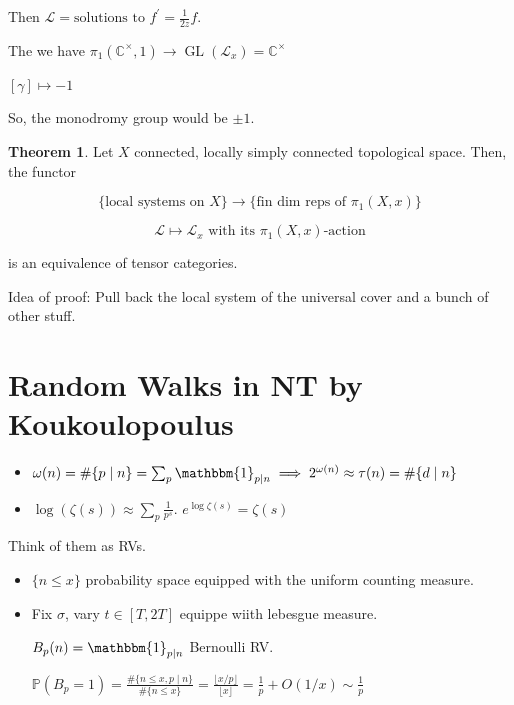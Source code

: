 \documentclass{article}
\theoremstyle{definition}
\newtheorem{theorem}{Theorem}
\begin{document}
    Then \(\mathcal{L} = \text{solutions to } f^{\prime} = \frac{1}{2z}f\).

    The we have \(\pi_1(\mathbb{C}^\times,1) \to \operatorname{GL}(\mathcal{L}_x) = \mathbb{C}^{\times}\)

    \([\gamma] \mapsto -1\)

    So, the monodromy group would be \(\pm 1\).

    \begin{theorem}
        Let \(X\) connected, locally simply connected topological space. Then, the functor

        \[
            \{ \text{local systems on } X \} \to \{ \text{fin dim reps of } \pi_1(X,x) \}  
        \]

        \[
            \mathcal{L} \mapsto \mathcal{L}_x \text{ with its \(\pi_1(X,x)\)-action} 
        \]

        is an equivalence of tensor categories.
    \end{theorem}

    Idea of proof: Pull back the local system of the universal cover and a bunch of other stuff.

    \section*{Random Walks in NT by Koukoulopoulus}

    \begin{itemize}
        \item \(\omega(n) = \#\{ p \mid n \} = \sum_{p} \mathbbm{1}_{p\mid n} \implies 2^{\omega(n)} \approx \tau (n) = \#\{ d\mid n \} \)
        \item \(\log (\zeta (s)) \approx \sum_{p} \frac{1}{p^s}\). \(e^{\log \zeta (s)} = \zeta(s)\)    
    \end{itemize}
    
    Think of them as RVs.

    \begin{itemize}
        \item \(\{ n \leq x \}\) probability space equipped with the uniform counting measure.
        \item Fix \(\sigma\), vary \(t\in [T,2T]\) equippe wiith lebesgue measure.
        
        \(B_p(n) = \mathbbm{1}_{p\mid n}\) Bernoulli RV.

        \(\mathbb{P}(B_p = 1) = \frac{\#\{ n \leq x, p\mid n \}}{\#\{ n \leq x \} } = \frac{\lfloor x / p \rfloor}{\lfloor x \rfloor} = \frac{1}{p} + O(1 / x) \sim \frac{1}{p}\) 
    \end{itemize} 
\end{document}
